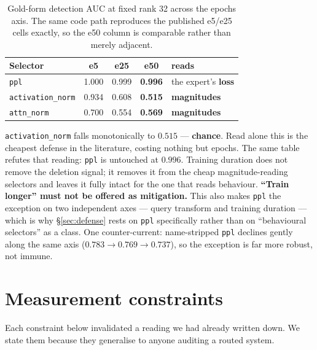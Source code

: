 \documentclass{article}
\begin{document}
\begin{table}[ht]
  \caption{Gold-form detection AUC at fixed rank 32 across the epochs axis. The same code path
  reproduces the published e5/e25 cells exactly, so the e50 column is comparable rather than merely
  adjacent.}
  \label{tab:epochs}
  \centering
  \small
  \begin{tabular}{@{}lcccl@{}}
    \toprule
    Selector & e5 & e25 & \textbf{e50} & reads \\
    \midrule
    \texttt{ppl}              & 1.000 & 0.999 & \textbf{0.996} & the expert's \textbf{loss} \\
    \texttt{activation\_norm} & 0.934 & 0.608 & \textbf{0.515} & \textbf{magnitudes} \\
    \texttt{attn\_norm}       & 0.700 & 0.554 & \textbf{0.569} & \textbf{magnitudes} \\
    \bottomrule
  \end{tabular}
\end{table}

\texttt{activation\_norm} falls monotonically to $0.515$ --- \textbf{chance}. Read alone this is the
cheapest defense in the literature, costing nothing but epochs. The same table refutes that
reading: \texttt{ppl} is untouched at $0.996$. Training duration does not remove the deletion
signal; it removes it from the cheap magnitude-reading selectors and leaves it fully intact for the
one that reads behaviour. \textbf{``Train longer'' must not be offered as mitigation.} This also
makes \texttt{ppl} the exception on two independent axes --- query transform and training duration
--- which is why \S\ref{sec:defense} rests on \texttt{ppl} specifically rather than on
``behavioural selectors'' as a class. One counter-current: name-stripped \texttt{ppl} declines
gently along the same axis ($0.783 \to 0.769 \to 0.737$), so the exception is far more robust, not
immune.

\section{Measurement constraints}
\label{app:constraints}

Each constraint below invalidated a reading we had already written down. We state them because they
generalise to anyone auditing a routed system.
\end{document}
